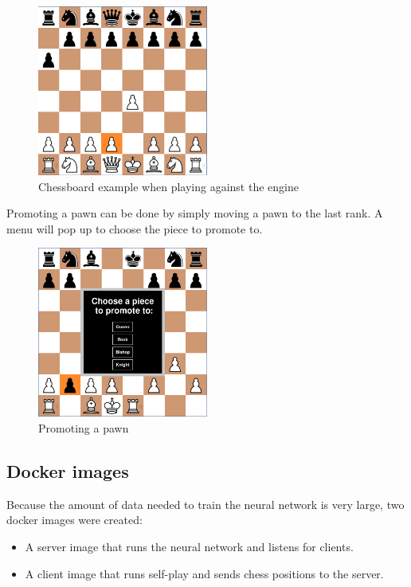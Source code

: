 \documentclass{article}
\begin{document}
\begin{figure}[H]
    \centering
    \includegraphics[width=0.5\textwidth]{img/chessboard-gui.png}
    \caption{Chessboard example when playing against the engine}
\end{figure}

Promoting a pawn can be done by simply moving a pawn to the last rank. A menu will pop up 
to choose the piece to promote to.

\begin{figure}[H]
    \centering
    \includegraphics[width=0.5\textwidth]{img/chessboard-promotion.png}
    \caption{Promoting a pawn}
\end{figure}

\subsection{Docker images}

Because the amount of data needed to train the neural network is very large, two docker images were created:

\begin{itemize}
    \item A server image that runs the neural network and listens for clients.
    \item A client image that runs self-play and sends chess positions to the server.
\end{itemize}
\end{document}
